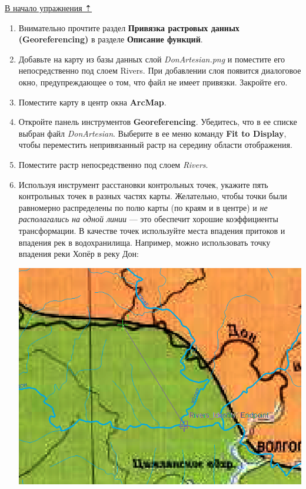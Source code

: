 \documentclass[]{book}
\theoremstyle{definition}
\theoremstyle{definition}
\theoremstyle{definition}
\theoremstyle{remark}
\begin{document}
\protect\hyperlink{map-ref-hydrogeologic}{В начало упражнения ⇡}

\begin{enumerate}
\def\labelenumi{\arabic{enumi}.}
\item
  Внимательно прочтите раздел \textbf{Привязка растровых данных
  (Georeferencing)} в разделе \textbf{Описание функций}.
\item
  Добавьте на карту из базы данных слой \emph{DonArtesian.png} и
  поместите его непосредственно под слоем Rivers. При добавлении слоя
  появится диалоговое окно, предупреждающее о том, что файл не имеет
  привязки. Закройте его.
\item
  Поместите карту в центр окна \textbf{ArcMap}.
\item
  Откройте панель инструментов \textbf{Georeferencing}. Убедитесь, что в
  ее списке выбран файл \emph{DonArtesian}. Выберите в ее меню команду
  \textbf{Fit to Display}, чтобы переместить непривязанный растр на
  середину области отображения.
\item
  Поместите растр непосредственно под слоем \emph{Rivers}.
\item
  Используя инструмент расстановки контрольных точек, укажите пять
  контрольных точек в разных частях карты. Желательно, чтобы точки были
  равномерно распределены по полю карты (по краям и в центре) и \emph{не
  располагались на одной линии} --- это обеспечит хорошие коэффициенты
  трансформации. В качестве точек используйте места впадения притоков и
  впадения рек в водохранилища. Например, можно использовать точку
  впадения реки Хопёр в реку Дон:

  \includegraphics{images/Ex06/image10.png}


\end{enumerate}
\end{document}
